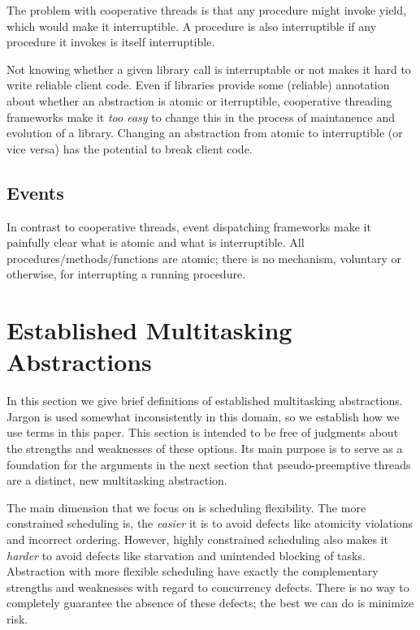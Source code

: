 \documentclass[9pt,preprint]{sigplanconf}
\begin{document}
The problem with cooperative threads is that any procedure might invoke yield, which would make it interruptible.
A procedure is also interruptible if any procedure it invokes is itself interruptible.

Not knowing whether a given library call is interruptable or not makes it hard to write reliable client code.
Even if libraries provide some (reliable) annotation about whether an abstraction is atomic or iterruptible, cooperative threading frameworks make it \emph{too easy} to change this in the process of maintanence and evolution of a library.
Changing an abstraction from atomic to interruptible (or vice versa) has the potential to break client code.




\subsection{Events}

In contrast to cooperative threads, event dispatching frameworks make it painfully clear what is atomic and what is interruptible.
All procedures/methods/functions are atomic; there is no mechanism, voluntary or otherwise, for interrupting a running procedure.

\section{Established Multitasking Abstractions}

In this section we give brief definitions of established multitasking abstractions.
Jargon is used somewhat inconsistently in this domain, so we establish how we use terms in this paper.
This section is intended to be free of judgments about the strengths and weaknesses of these options.
Its main purpose is to serve as a foundation for the arguments in the next section that pseudo-preemptive threads are a distinct, new multitasking abstraction.

The main dimension that we focus on is scheduling flexibility.
The more constrained scheduling is, the \emph{easier} it is to avoid defects like atomicity violations and incorrect ordering.
However, highly constrained scheduling also makes it \emph{harder} to avoid defects like starvation and unintended blocking of tasks.
Abstraction with more flexible scheduling have exactly the complementary strengths and weaknesses with regard to concurrency defects.
There is no way to completely guarantee the absence of these defects; the best we can do is minimize risk.
\end{document}
